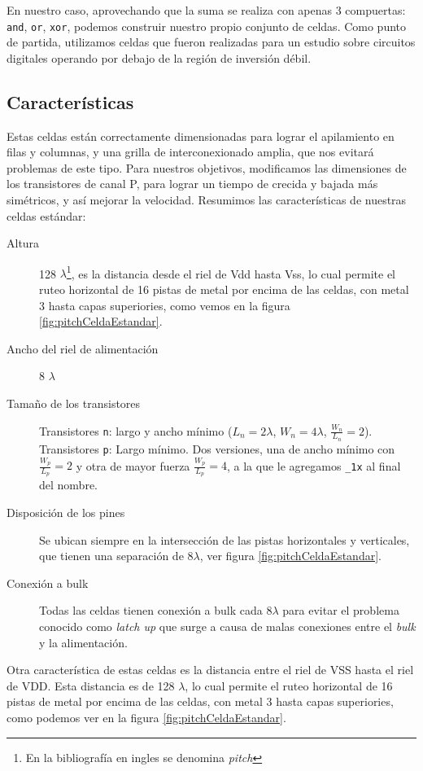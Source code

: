 En nuestro caso, aprovechando que la suma se realiza con apenas 3 compuertas: \verb.and., \verb.or., \verb.xor., podemos construir nuestro propio conjunto de celdas. Como punto de partida, utilizamos celdas que fueron realizadas para un estudio sobre circuitos digitales operando por debajo de la región de inversión débil\cite{subthresholdArith}.
\subsection{Características}
Estas celdas están correctamente dimensionadas para lograr el apilamiento en filas y columnas, y una grilla de interconexionado amplia, que nos evitará problemas de este tipo. Para nuestros objetivos, modificamos las dimensiones de los transistores de canal P, para lograr un tiempo de crecida y bajada más simétricos, y así mejorar la velocidad. Resumimos las características de nuestras celdas estándar:


\begin{description}
\item[Altura] 128 $\lambda$\footnote{En la bibliografía en ingles se denomina \emph{pitch}}, es la distancia desde el riel de Vdd hasta Vss, lo cual permite el ruteo horizontal de 16 pistas de metal por encima de las celdas, con metal 3 hasta capas superiories, como vemos en la figura \ref{fig:pitchCeldaEstandar}.  
\item[Ancho del riel de alimentación] 8 $\lambda$
\item[Tamaño de los transistores] Transistores \verb.n.: largo y ancho mínimo ($L_n = 2 \lambda$, $W_n =4 \lambda$, $\frac{W_n}{L_n}=2$). Transistores \verb.p.: Largo mínimo. Dos versiones, una de ancho mínimo con $\frac{W_p}{L_p}=2$ y otra de mayor fuerza $\frac{W_p}{L_p}=4$, a la que le agregamos \verb._1x. al final del nombre. 
\item[Disposición de los pines] Se ubican siempre en la intersección de las pistas horizontales y verticales, que tienen una separación de $8 \lambda$, ver figura \ref{fig:pitchCeldaEstandar}.
\item[Conexión a bulk] Todas las celdas tienen conexión a bulk cada $8\lambda$ para evitar el problema conocido como \emph{latch up} que surge a causa de malas conexiones entre el \emph{bulk} y la alimentación.
\end{description}


Otra característica de estas celdas es la distancia entre el riel de VSS hasta el riel de VDD. Esta distancia es de 128 $\lambda$, lo cual permite el ruteo horizontal de 16 pistas de metal por encima de las celdas, con metal 3 hasta capas superiories, como podemos ver en la figura \ref{fig:pitchCeldaEstandar}.  

